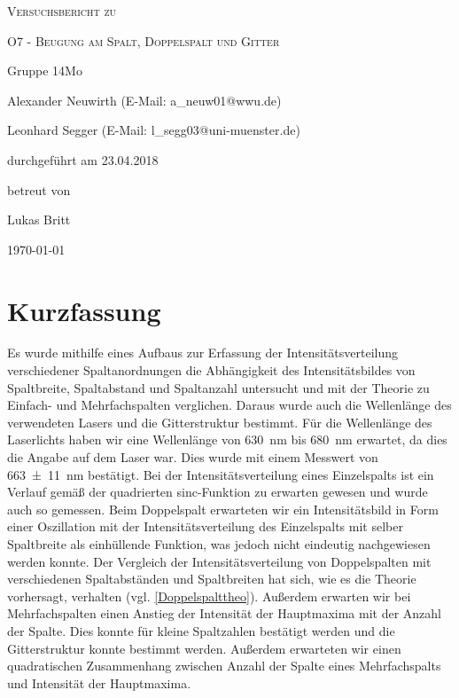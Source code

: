 \documentclass[
	a4paper,
	12pt,
	pagesize,
	ngerman
]{scrartcl}
\begin{document}
	
	\begin{titlepage}
		\centering
		{\scshape\LARGE Versuchsbericht zu \par}
		\vspace{1cm}
		{\scshape\huge O7 - Beugung am Spalt, Doppelspalt und Gitter \par}
		\vspace{2.5cm}
		{\LARGE Gruppe 14Mo \par}
		\vspace{0.5cm}
		
		{\large Alexander Neuwirth (E-Mail: a\_neuw01@wwu.de) \par}
		{\large Leonhard Segger (E-Mail: l\_segg03@uni-muenster.de) \par}
		\vfill
		
		durchgeführt am 23.04.2018\par
		betreut von\par
		{\large Lukas Britt}
		
		\vfill
		
		{\large \today\par}
	\end{titlepage}
	\tableofcontents
	\newpage

	\section{Kurzfassung}
	
	Es wurde mithilfe eines Aufbaus zur Erfassung der Intensitätsverteilung verschiedener Spaltanordnungen die Abhängigkeit des Intensitätsbildes von Spaltbreite, Spaltabstand und Spaltanzahl untersucht und mit der Theorie zu Einfach- und Mehrfachspalten verglichen.
	Daraus wurde auch die Wellenlänge des verwendeten Lasers und die Gitterstruktur bestimmt.
	Für die Wellenlänge des Laserlichts haben wir eine Wellenlänge von \SI{630}{\nano \meter} bis \SI{680}{\nano \meter} erwartet, da dies die Angabe auf dem Laser war.
	Dies wurde mit einem Messwert von \SI{663 \pm 11}{nm} bestätigt.
	Bei der Intensitätsverteilung eines Einzelspalts ist ein Verlauf gemäß der quadrierten sinc-Funktion zu erwarten gewesen und wurde auch so gemessen.
	Beim Doppelspalt erwarteten wir ein Intensitätsbild in Form einer Oszillation mit der Intensitätsverteilung des Einzelspalts mit selber Spaltbreite als einhüllende Funktion, was jedoch nicht eindeutig nachgewiesen werden konnte.
	Der Vergleich der Intensitätsverteilung von Doppelspalten mit verschiedenen Spaltabständen und Spaltbreiten hat sich, wie es die Theorie vorhersagt, verhalten (vgl. \cref{Doppelspalttheo}). 
	Außerdem erwarten wir bei Mehrfachspalten einen Anstieg der Intensität der Hauptmaxima mit der Anzahl der Spalte.
	Dies konnte für kleine Spaltzahlen bestätigt werden und die Gitterstruktur konnte bestimmt werden.
	Außerdem erwarteten wir einen quadratischen Zusammenhang zwischen Anzahl der Spalte eines Mehrfachspalts und Intensität der Hauptmaxima.
	
\end{document}
